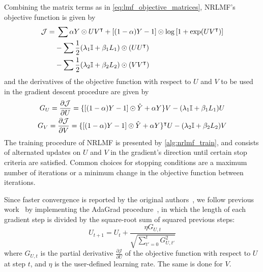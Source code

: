 \begin{apendicesenv}
Combining the matrix terms as in \autoref{eq:lmf_objective_matrices}, NRLMF's objective function is given by
%
\begin{equation}
    \begin{split}
        \mathcal{J} = &\; \sum
                \alpha Y \odot UV^\intercal
                + [(1 - \alpha) Y - 1] \odot \log \left[1+\exp(UV^\intercal)\right]\\
            &- \sum \frac{1}{2} (\lambda_1\mathbb{I} + \beta_1 L_1) \odot (U U^\intercal)\\
            &- \sum \frac{1}{2} (\lambda_2\mathbb{I} + \beta_2 L_2) \odot (V V^\intercal)
    \end{split}
    \label{eq:nrlmf_objective}
\end{equation}
%
and the derivatives of the objective function with respect to $U$ and $V$ to be used in the gradient descent procedure are given by
\begin{gather}
    G_U = \frac{\partial \mathcal{J}}{\partial U} =
        \{[(1 - \alpha) Y - 1] \odot \hat Y + \alpha Y\}V
        - (\lambda_1\mathbb{I} + \beta_1 L_1) U
    \label{eq:nrlmf_gradient_U}
    \\
    G_V = \frac{\partial \mathcal{J}}{\partial V} =
        \{[(1 - \alpha) Y - 1] \odot \hat Y + \alpha Y\}^\intercal U
        - (\lambda_2\mathbb{I} + \beta_2 L_2) V
    \label{eq:nrlmf_gradient_V}
\end{gather}
%
The training procedure of NRLMF is presented by \autoref{alg:nrlmf_train}, and consists of alternated updates on $U$ and $V$ in the gradient's direction until certain stop criteria are satisfied. Common choices for stopping conditions are a maximum number of iterations or a minimum change in the objective function between iterations.

Since faster convergence is reported by the original authors~\cite{johnsonlogistic}, we follow previous work~\cite{johnsonlogistic,liu2016neighborhood,hao2017predicting,li2019dnilmflda} by implementing the AdaGrad procedure~\cite{duchi2011adaptive}, in which the length of each gradient step is divided by the square-root sum of squared previous steps:
%
\begin{equation}
    U_{t+1} = U_t + \frac{\eta G_{U,t}}{\sqrt{\sum_{t'=0}^t G_{U,t'}^2}}
\end{equation}
%
where $G_{U,t}$ is the partial derivative $\frac{\partial\mathcal{J}}{\partial U}$ of the objective function with respect to $U$ at step $t$, and $\eta$ is the user-defined learning rate. The same is done for $V$.


\end{apendicesenv}
